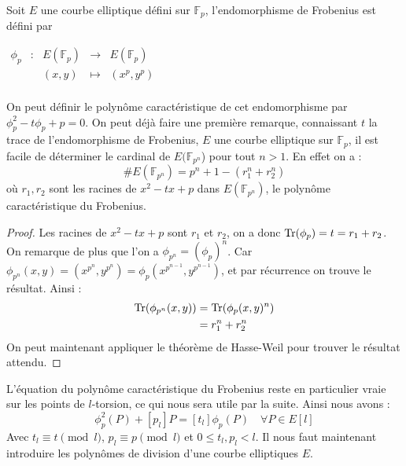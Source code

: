\documentclass[12pt]{article}
\def\Tr{\mathop{\rm{Tr}}\nolimits}
\begin{document}
\begin{defi}[Frobenius]
Soit $E$ une courbe elliptique défini sur $\mathbb{F}_p$, l'endomorphisme de Frobenius est défini par 

$\begin{array}{ccccc}
\phi_p & : & E(\mathbb{F}_p) & \to & E(\mathbb{F}_p) \\
 & & (x,y) & \mapsto & (x^p, y^p) \\
\end{array}$
\end{defi}
On peut définir le polynôme caractéristique de cet endomorphisme par $\phi_p^2 - t \phi_p + p = 0$.
On peut déjà faire une première remarque, connaissant $t$ la trace de l'endomorphisme de Frobenius, $E$ une courbe elliptique sur $\mathbb{F}_p$, il est facile de déterminer le cardinal de $E(\mathbb{F}_{p^n}$) pour tout $n >1$. En effet on a :
\begin{equation*}
\#E(\mathbb{F}_{p^n}) = p^n + 1- (r_1^n + r_2^n)
\end{equation*}
où $r_1, r_2$ sont les racines de $x^2 - tx +p$ dans $E(\mathbb{F}_{p^n})$, le polynôme caractéristique du Frobenius.
\begin{proof}
Les racines de $x^2 - tx +p$ sont $r_1$ et $r_2$, on a donc $\Tr(\phi_p) = t = r_1 + r_2$. 
\newline
On remarque de plus que l'on a $\phi_{p^n} = (\phi_p)^n$. Car $\phi_{p^n} (x,y) = (x^{p^n}, y^{p^n}) = \phi_p  (x^{p^{n-1}}, y^{p^{n-1}})$, et par récurrence on trouve le résultat.
\newline
Ainsi : 
\begin{align*}
\Tr(\phi_{p^n} (x,y)) &= \Tr(\phi_{p} (x,y)^n) \\
					 &= r_1^n + r_2^n	 
\end{align*}
On peut maintenant appliquer le théorème de Hasse-Weil pour trouver le résultat attendu.
\end{proof}

L'équation du polynôme caractéristique du Frobenius reste en particulier vraie sur les points de $l$-torsion, ce qui nous sera utile par la suite. Ainsi nous avons : 
\begin{equation}
\label{eqnfrobenius}
 \phi_p^2(P)  + [p_l]P = [t_{l}] \phi_p(P) \quad \forall P \in E[l]
\end{equation} 
Avec $t_l \equiv t \pmod l$, $p_l \equiv p \pmod l$ et $0 \leq t_l, p_l < l$. 
\newline
Il nous faut maintenant introduire les polynômes de division d'une courbe elliptiques $E$.
\end{document}
